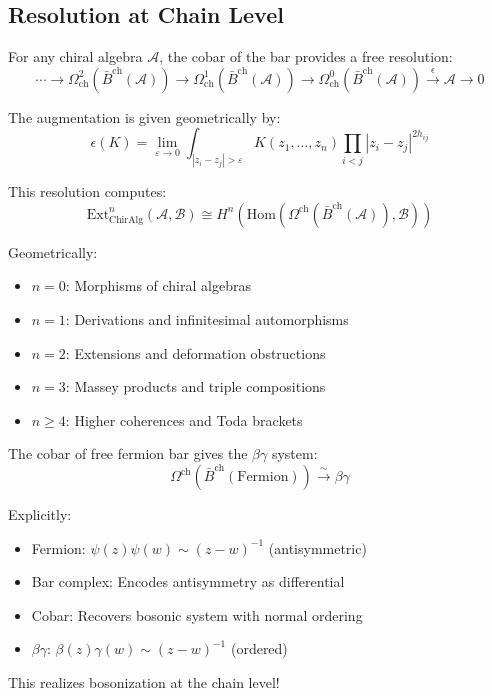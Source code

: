 \subsection{Resolution at Chain Level}

\begin{theorem}
For any chiral algebra $\mathcal{A}$, the cobar of the bar provides a free resolution:
$$\cdots \to \Omega^2_{\text{ch}}(\bar{B}^{\text{ch}}(\mathcal{A})) \to \Omega^1_{\text{ch}}(\bar{B}^{\text{ch}}(\mathcal{A})) \to \Omega^0_{\text{ch}}(\bar{B}^{\text{ch}}(\mathcal{A})) \xrightarrow{\epsilon} \mathcal{A} \to 0$$

The augmentation is given geometrically by:
$$\epsilon(K) = \lim_{\varepsilon \to 0} \int_{|z_i - z_j| > \varepsilon} K(z_1, \ldots, z_n) \prod_{i<j} |z_i - z_j|^{2h_{ij}}$$
\end{theorem}

\begin{remark}
This resolution computes:
$$\text{Ext}^n_{\text{ChirAlg}}(\mathcal{A}, \mathcal{B}) \cong H^n(\text{Hom}(\Omega^{\text{ch}}(\bar{B}^{\text{ch}}(\mathcal{A})), \mathcal{B}))$$

Geometrically:
\begin{itemize}
\item $n = 0$: Morphisms of chiral algebras
\item $n = 1$: Derivations and infinitesimal automorphisms
\item $n = 2$: Extensions and deformation obstructions
\item $n = 3$: Massey products and triple compositions
\item $n \geq 4$: Higher coherences and Toda brackets
\end{itemize}
\end{remark}

\begin{example}
The cobar of free fermion bar gives the $\beta\gamma$ system:
$$\Omega^{\text{ch}}(\bar{B}^{\text{ch}}(\text{Fermion})) \xrightarrow{\sim} \beta\gamma$$

Explicitly:
\begin{itemize}
\item Fermion: $\psi(z)\psi(w) \sim (z-w)^{-1}$ (antisymmetric)
\item Bar complex: Encodes antisymmetry as differential
\item Cobar: Recovers bosonic system with normal ordering
\item $\beta\gamma$: $\beta(z)\gamma(w) \sim (z-w)^{-1}$ (ordered)
\end{itemize}

This realizes bosonization at the chain level!
\end{example}

